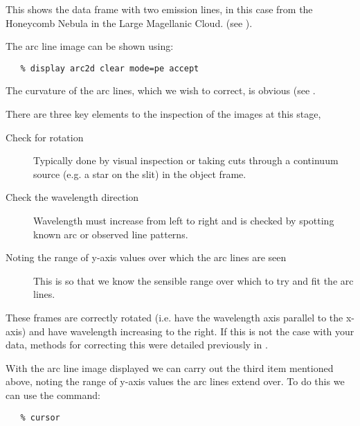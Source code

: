 This shows the data frame with two emission lines, in this case from the Honeycomb Nebula in the Large Magellanic Cloud.  (see
).

The arc line image can be shown using:

{
\scspec{\small}{ }
\begin{verbatim}
   % display arc2d clear mode=pe accept
\end{verbatim}
}

The curvature of the arc lines, which we wish to correct, is obvious (see .

There are three key elements to the inspection of the images at this stage,

\begin{description}

\item [Check for rotation]
      Typically done by visual inspection or taking cuts through a continuum source (e.g. a star on the slit) in the object frame.

\item [Check the wavelength direction]
      Wavelength must increase from left to right and is checked by spotting known arc or observed line patterns.

\item [Noting the range of y-axis values over which the arc lines are seen]
      This is so that we know the sensible range over which to try and fit the arc lines.

\end{description}


These frames are correctly rotated (i.e. have the wavelength axis parallel to the x-axis) and have wavelength increasing to the right. If this is not the case with your data, methods for correcting this were detailed previously in \scspec{\S\ref{inspecting_the_images}}
{}.

With the arc line image displayed we can carry out the third item mentioned above, noting the range of y-axis values the arc lines extend over. To do this we can use the 
 command:


{
\scspec{\small}{ }
\begin{verbatim}
   % cursor
\end{verbatim}
}

